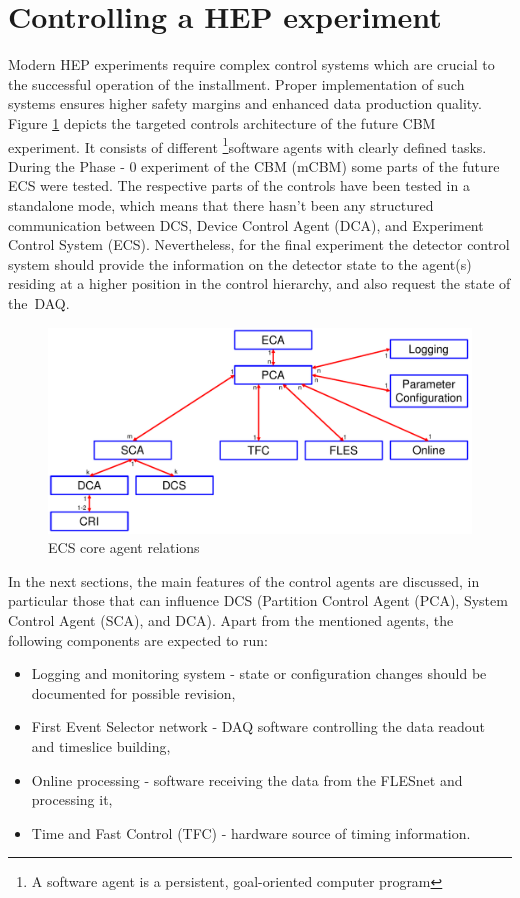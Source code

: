 \section{Controlling a HEP experiment}

Modern \gls{HEP} experiments require complex control systems which are crucial to the successful operation of the installment. Proper implementation of such systems ensures higher safety margins and enhanced data production quality. 
Figure \ref{fig_sim} depicts the targeted controls architecture of the future \gls{CBM} experiment. It consists of different \footnote{A software agent is a persistent, goal-oriented computer program}{software agents} with clearly defined tasks. During the Phase - 0 experiment of the \gls{CBM} (\gls{mCBM}) some parts of the future \gls{ECS} were tested. The respective parts of the controls have been tested in a standalone mode, which means that there hasn't been any structured communication between \gls{DCS}, Device Control Agent (\gls{DCA}), and Experiment Control System (\gls{ECS}). Nevertheless, for the final experiment the detector control system should provide the information on the detector state to the agent(s) residing at a higher position in the control hierarchy, and also request the state of the~\gls{DAQ}.
\begin{figure}[!h]
\centering
\includegraphics[width=0.8\columnwidth]{Chapter3/Controls/images/AgentsRelations_V2.pdf}
\caption{\gls{ECS} core agent relations}
\label{fig_sim}
\end{figure}

 In the next sections, the main features of the control agents are discussed, in particular those that can influence \gls{DCS} (Partition Control Agent (\gls{PCA}), System Control Agent (\gls{SCA}), and \gls{DCA}). Apart from the mentioned agents, the following components are expected to run: 
 \begin{itemize}
     \item Logging and monitoring system - state or configuration changes should be documented for possible revision,
     \item First Event Selector network - \gls{DAQ} software controlling the data readout and timeslice building,
     \item Online processing - software receiving the data from the FLESnet and processing it,
     \item Time and Fast Control (\gls{TFC}) - hardware source of timing information.
 \end{itemize}
